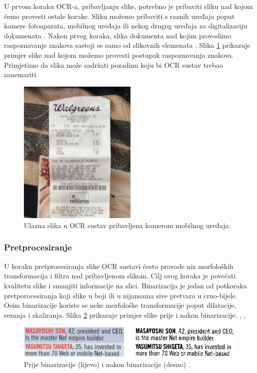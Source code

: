 \documentclass[times, utf8, zavrsni]{fer}
\begin{document}
U prvom koraku OCR-a, pribavljanju slike, potrebno je pribaviti sliku nad kojom ćemo
provesti ostale korake. Sliku možemo pribaviti s raznih uređaja poput kamere fotoaparata,
mobilnog uređaja ili nekog drugog uređaja za digitalizaciju dokumenata .
Nakon prvog koraka, slika dokumenta nad kojim provodimo raspoznavanje znakova sastoji se
samo od slikovnih elemenata  \citep{Vynckier:2018:HowOcrWorks}.
Slika \ref{fig:receipt-example-02} prikazuje primjer slike nad kojom možemo provesti
postupak raspoznavanja znakova. Primjetimo da slika može sadržati pozadinu koju bi
OCR sustav trebao zanemariti.

\begin{figure}[htb]
    \centering
    \includegraphics[height=7cm]{images/receipt-example-02.jpeg}
    \caption{Ulazna slika u OCR sustav pribavljena kamerom mobilnog uređaja.}
    \label{fig:receipt-example-02}
\end{figure}

\subsubsection{Pretprocesiranje}

U koraku pretprocesiranja slike OCR sustavi često provode niz morfoloških transformacija i filtra nad pribavljenom slikom.
Cilj ovog koraka je povećati kvalitetu slike i smanjiti informacije na slici. Binarizacija je jedan od
potkoraka pretporocesiranja koji slike u boji ili u nijansama sive pretvara u crno-bijele. Osim binarizacije
koriste se neke morfološke transformacije poput dilatacije, rezanja i skaliranja.
Slika \ref{fig:binarization} prikazuje primjer slike prije i nakon binarizacije. \citep{Gulan:2016:Bacherlor},
\citep{DBLP:journals/corr/abs-1710-05703}, \citep{Jurin:2017:Master}

\begin{figure}[htb]
    \centering
    \includegraphics[width=\textwidth]{images/binarization.png}
    \caption{Prije binarizacije (lijevo) i nakon binarizacije (desno) \citep{Vynckier:2018:HowOcrWorks}.}
    \label{fig:binarization}
\end{figure}
\end{document}
